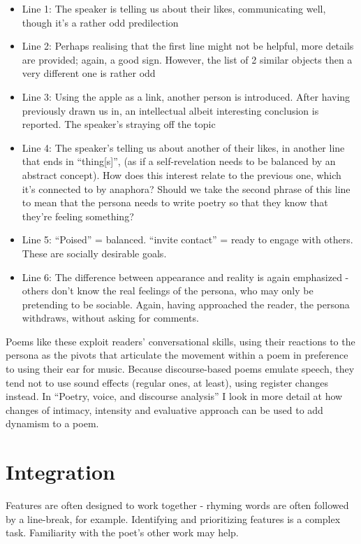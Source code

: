\documentclass[11pt]{article}
\begin{document}
\begin{itemize}
\item Line 1: The speaker is telling us about their likes, communicating well, though it's a rather odd predilection
\item Line 2: Perhaps realising that the first line might not be helpful, more details are provided; again, a good sign. However, the list of 2 similar objects then a very different one is rather odd
\item Line 3: Using the apple as a link, another person is introduced. After having previously drawn us in, an intellectual albeit interesting conclusion is reported. The speaker's straying off the topic
\item Line 4: The speaker's telling us about another of their likes, in another line that ends in ``thing[s]'', (as if a self-revelation needs to be balanced by an abstract concept). How does this interest relate to the previous one, which it's connected to by anaphora? Should we take the second phrase of this line to mean that the persona needs to write poetry so that they know that they're feeling something?
\item Line 5: ``Poised'' = balanced. ``invite contact'' = ready to engage with others. These are socially desirable goals.
\item Line 6: The difference between appearance and reality is again emphasized - others don't know the real feelings of the persona, who may only be pretending to be sociable. Again, having approached the reader, the persona withdraws, without asking for comments.
\end{itemize}

Poems like these exploit readers' conversational skills, using their reactions to the persona as the pivots that articulate the movement within a poem in preference to using their ear for music. Because discourse-based poems emulate speech, they tend not to use sound effects (regular ones, at least), using register changes instead. In ``Poetry, voice, and discourse analysis'' I look in more detail at how changes of intimacy, intensity and evaluative approach can be used to add dynamism to a poem.



\newpage
\section{Integration}
Features are often designed to work together - rhyming words are often followed by a line-break, for example. Identifying and prioritizing features is a complex task. Familiarity with the poet's other work may help.
\end{document}
